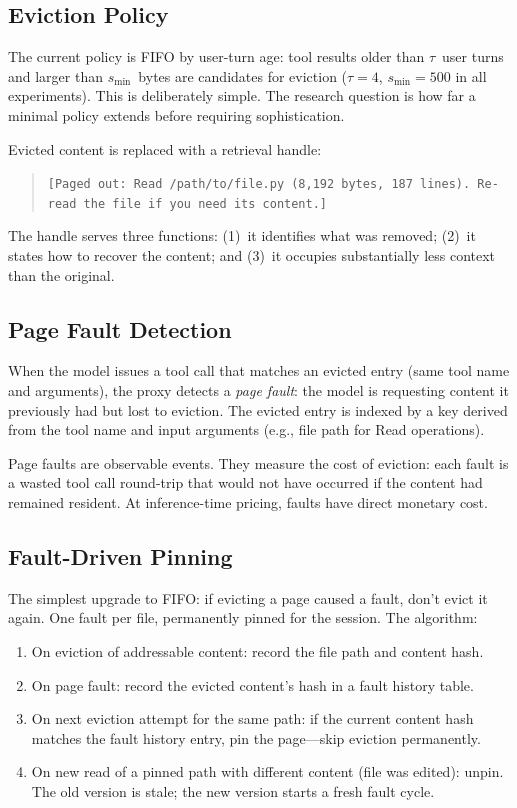 \subsection{Eviction Policy}

The current policy is FIFO by user-turn age: tool results older than
$\tau$~user turns and larger than $s_{\min}$~bytes are candidates
for eviction ($\tau = 4$, $s_{\min} = 500$ in all experiments). This
is deliberately simple. The research question is how far a minimal
policy extends before requiring sophistication.

Evicted content is replaced with a retrieval handle:

\begin{quote}
\small\texttt{[Paged out: Read /path/to/file.py (8,192 bytes,
187 lines). Re-read the file if you need its content.]}
\end{quote}

The handle serves three functions: (1)~it identifies what was
removed; (2)~it states how to recover the content; and (3)~it
occupies substantially less context than the original.

\subsection{Page Fault Detection}

When the model issues a tool call that matches an evicted entry (same
tool name and arguments), the proxy detects a \emph{page fault}: the
model is requesting content it previously had but lost to eviction.
The evicted entry is indexed by a key derived from the tool name and
input arguments (e.g., file path for Read operations).

Page faults are observable events. They measure the cost of eviction:
each fault is a wasted tool call round-trip that would not have
occurred if the content had remained resident. At inference-time
pricing, faults have direct monetary cost.

\subsection{Fault-Driven Pinning}
\label{sec:pinning}

The simplest upgrade to FIFO: if evicting a page caused a fault,
don't evict it again. One fault per file, permanently pinned for the
session. The algorithm:

\begin{enumerate}[nosep]
  \item On eviction of addressable content: record the file path and
    content hash.
  \item On page fault: record the evicted content's hash in a fault
    history table.
  \item On next eviction attempt for the same path: if the current
    content hash matches the fault history entry, pin the page---skip
    eviction permanently.
  \item On new read of a pinned path with different content (file was
    edited): unpin. The old version is stale; the new version starts
    a fresh fault cycle.
\end{enumerate}

